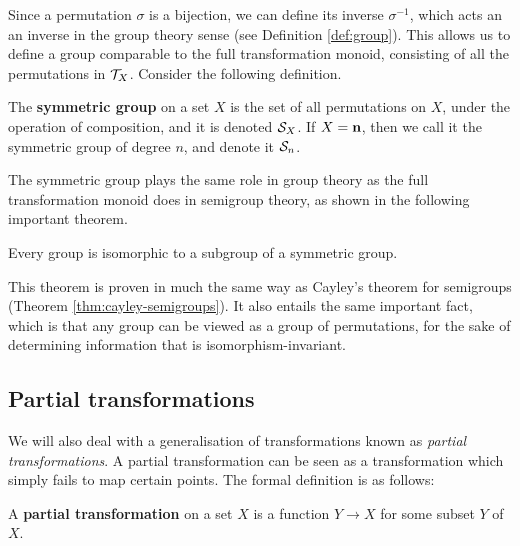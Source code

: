 Since a permutation $\sigma$ is a bijection, we can define its inverse
$\sigma^{-1}$, which acts an an inverse in the group theory sense (see
Definition \ref{def:group}).  This allows us to define a group comparable to the
full transformation monoid, consisting of all the permutations in $\mathcal{T}_X$.
Consider the following definition.

\begin{definition}
  \label{def:sn}
  The \textbf{symmetric group} on a set $X$ is the set of all permutations on
  $X$, under the operation of composition, and it is denoted $\mathcal{S}_X$.  If
  $X = \mathbf{n}$, then we call it the symmetric group of degree $n$, and denote it
  $\mathcal{S}_n$.
\end{definition}

The symmetric group plays the same role in group theory as the full
transformation monoid does in semigroup theory, as shown in the following
important theorem.

\begin{theorem}
  \label{thm:cayley-groups}
  Every group is isomorphic to a subgroup of a symmetric group.
\end{theorem}

This theorem is proven in much the same way as Cayley's theorem for semigroups
(Theorem \ref{thm:cayley-semigroups}).  It also entails the same important fact,
which is that any group can be viewed as a group of permutations, for the sake
of determining information that is isomorphism-invariant.

\subsection{Partial transformations}
\label{sec:partial-transformations}

We will also deal with a generalisation of transformations known as
\textit{partial transformations}.  A partial transformation can be seen as a
transformation which simply fails to map certain points.  The formal definition
is as follows:

\begin{definition}
  \label{def:partial-transformation}
  A \textbf{partial transformation} on a set $X$ is a function $Y \to X$ for
  some subset $Y$ of $X$.
\end{definition}


